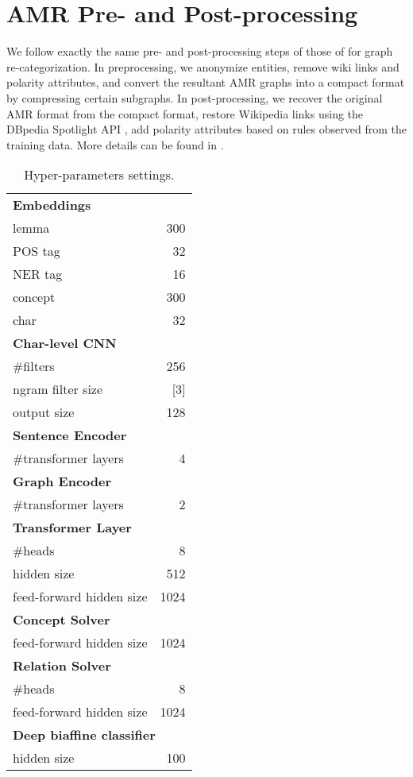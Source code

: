 \documentclass[11pt,a4paper]{article}
\begin{document}
\section{AMR Pre- and Post-processing}
We follow exactly the same pre- and post-processing steps of those of  for graph re-categorization. In preprocessing, we anonymize entities, remove wiki links and polarity attributes, and convert the resultant AMR graphs into a compact format by compressing certain subgraphs. In post-processing, we recover the original AMR format from the compact format, restore Wikipedia links using the DBpedia Spotlight API \cite{daiber2013improving}, add polarity attributes based on rules observed from the training data. More details can be found in .
\begin{table}[t]
	\centering
	\begin{tabular}{lr}
		\hline
		\multicolumn{2}{l}{\textbf{Embeddings}} \\
		lemma & 300 \\
		POS tag& 32 \\
		NER tag & 16 \\
		concept & 300 \\
		char & 32 \\
		\hline
		\multicolumn{2}{l}{\textbf{Char-level CNN}} \\
		\#filters & 256 \\
		ngram filter size & [3] \\
		output size & 128 \\
		\hline
		\multicolumn{2}{l}{\textbf{Sentence Encoder}} \\
		\#transformer layers & 4 \\
		\hline
		\multicolumn{2}{l}{\textbf{Graph Encoder}} \\
		\#transformer layers & 2 \\
		\hline
		\multicolumn{2}{l}{\textbf{Transformer Layer}} \\
		\#heads & 8 \\
		hidden size & 512 \\
		feed-forward hidden size & 1024 \\
		\hline
		\multicolumn{2}{l}{\textbf{Concept Solver}} \\
		feed-forward hidden size & 1024 \\
		\hline
		\multicolumn{2}{l}{\textbf{Relation Solver}} \\
		\#heads & 8 \\
		feed-forward hidden size & 1024 \\
		\hline
		\multicolumn{2}{l}{\textbf{Deep biaffine classifier}} \\
		hidden size & 100 \\
		\hline
	\end{tabular}
	\caption{Hyper-parameters settings. }
	\label{setting}
\end{table}
\end{document}
